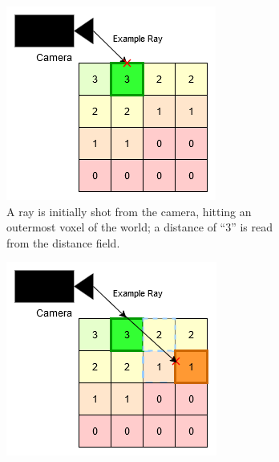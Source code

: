 \begin{figure}[htbp]
  \centering
  \begin{subfigure}[t]{0.32\textwidth}
    \centering
    \includegraphics[width=\textwidth]{figures/df_dda_1.drawio.png}
    \caption{A ray is initially shot from the camera, hitting an outermost voxel of the world; a distance of ``3''
      is read from the distance field.}
  \end{subfigure}
  \hfill
  \begin{subfigure}[t]{0.32\textwidth}
    \centering
    \includegraphics[width=\textwidth]{figures/df_dda_2.drawio.png}

\end{subfigure}
\end{figure}
